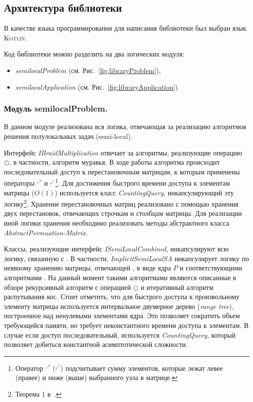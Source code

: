 
\subsection{Архитектура библиотеки}
В качестве языка программирования для написания библиотеки был выбран язык \textsc{Kotlin}.

Код библиотеки можно  разделить на два логических модуля:
\begin{itemize}
    \item \emph{semilocalProblem}  (см. Рис.~\ref{fig:libraryProblem}),
    \item \emph{semilocalApplication} (см. Рис.~\ref{fig:libraryApplication}).
\end{itemize}


\subsubsection{Модуль semilocalProblem.}
В данном модуле реализована вся логика, отвечающая за реализацию  алгоритмов решения полулокальных задач (semi-local).

Интерфейс \emph{IBraidMultiplication} отвечает за алгоритмы, реализующие операцию $\odot$, в частности, алгоритм муравья.
В ходе работы алгоритма происходит последовательный доступ к перестановочным матрицам, к которым применены операторы $^{\nearrow}$ и $^{\swarrow}$\footnote{Оператор $^{\nearrow}$ ($^{\swarrow}$)  подсчитывает сумму элементов, которые лежат левее (правее) и ниже (выше) выбранного узла в матрице.}.
Для достижения быстрого времени доступа к элементам  матрицы ($O(1)$) используется
класс \emph{CountingQuery}, инкапсулирующий эту логику\footnote{Теорема 1 в~\cite{tiskin2015fast}.}.
% 
Хранение перестановочных матриц реализовано с помощью хранения двух перестановок, отвечающих строчкам и столбцам матрицы.
Для реализации иной логики хранения необходимо реализовать методы абстрактного класса \emph{AbstractPermuation-Matrix}.

Классы, реализующие интерфейс \emph{ISemiLocalCombined}, инкапсулируют всю логику, связанную с  .
В частности, \emph{ImplicitSemiLocalSA} инкапсулирует логику по неявному хранению матрицы, отвечающей , в виде ядра $P$ и соответствующими алгоритмами .
На данный момент такими алгоритмами являются описанные в обзоре рекурсивный алгоритм с операцией $\odot$ и итеративный алгоритм распутывания кос.
Стоит отметить, что для быстрого доступа к произвольному элементу матрицы  используется интервальное двумерное дерево (\emph{range tree}), построенное над ненулевыми элементами ядра.
Это позволяет сократить объем требующейся памяти, но требует неконстантного времени доступа к элементам.
В случае если доступ последовательный, используется  \emph{CountingQuery}, который позволяет добиться константной асимптотической сложности.

